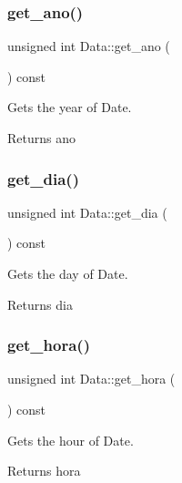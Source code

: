 \subsubsection{\texorpdfstring{get\+\_\+ano()}{get\_ano()}}
{\footnotesize\ttfamily unsigned int Data\+::get\+\_\+ano (\begin{DoxyParamCaption}{ }\end{DoxyParamCaption}) const}



Gets the year of Date. 

\begin{DoxyReturn}{Returns}
ano 
\end{DoxyReturn}
\mbox{\label{class_data_abe48e8942184962a9b299f1a38533d3e}} 
\subsubsection{\texorpdfstring{get\+\_\+dia()}{get\_dia()}}
{\footnotesize\ttfamily unsigned int Data\+::get\+\_\+dia (\begin{DoxyParamCaption}{ }\end{DoxyParamCaption}) const}



Gets the day of Date. 

\begin{DoxyReturn}{Returns}
dia 
\end{DoxyReturn}
\mbox{\label{class_data_a4fd55e69488db5ff91889f0d6bf8dd8a}} 
\subsubsection{\texorpdfstring{get\+\_\+hora()}{get\_hora()}}
{\footnotesize\ttfamily unsigned int Data\+::get\+\_\+hora (\begin{DoxyParamCaption}{ }\end{DoxyParamCaption}) const}



Gets the hour of Date. 

\begin{DoxyReturn}{Returns}
hora 
\end{DoxyReturn}
\mbox{\label{class_data_a2e3b1f959cbd56f06b778f5b1f86ddfa}} 
